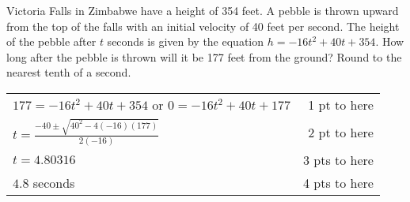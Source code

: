{
	Victoria Falls in Zimbabwe have a height of 354 feet. A pebble is thrown upward from the top of the falls with an initial velocity of 40 feet per second. The height of the pebble after $t$ seconds is given by the equation $h=-16t^2+40t+354$. How long after the pebble is thrown will it be 177 feet from the ground? Round to the nearest tenth of a second.
}
{
	\begin{tabular}{l r}
	$177=-16t^2+40t+354$ or $0=-16t^2+40t+177$ & 1 pt to here\\
	$t=\frac{-40 \pm \sqrt{40^2-4(-16)(177)}}{2(-16)}$ & 2 pt to here\\
	$t=4.80316$ &  3 pts to here\\
	$4.8$ seconds & 4 pts to here\\
	\end{tabular}
}

